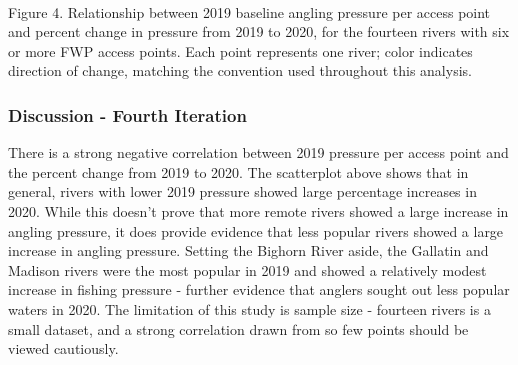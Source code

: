 \documentclass[11pt]{article}
\begin{document}
    \begin{center}
    \end{center}
    { \hspace*{\fill} \\}
    
    Figure 4. Relationship between 2019 baseline angling pressure per access
point and percent change in pressure from 2019 to 2020, for the fourteen
rivers with six or more FWP access points. Each point represents one
river; color indicates direction of change, matching the convention used
throughout this analysis.

    \hypertarget{discussion---fourth-iteration}{%
\subsubsection{Discussion - Fourth
Iteration}\label{discussion---fourth-iteration}}

There is a strong negative correlation between 2019 pressure per access
point and the percent change from 2019 to 2020. The scatterplot above
shows that in general, rivers with lower 2019 pressure showed large
percentage increases in 2020. While this doesn't prove that more remote
rivers showed a large increase in angling pressure, it does provide
evidence that less popular rivers showed a large increase in angling
pressure. Setting the Bighorn River aside, the Gallatin and Madison
rivers were the most popular in 2019 and showed a relatively modest
increase in fishing pressure - further evidence that anglers sought out
less popular waters in 2020. The limitation of this study is sample size
- fourteen rivers is a small dataset, and a strong correlation drawn
from so few points should be viewed cautiously.
\end{document}
